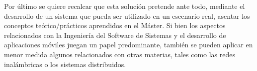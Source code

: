     Por último se quiere recalcar que esta solución pretende ante todo, mediante el desarrollo de un sistema que pueda ser utilizado en un escenario real, asentar los conceptos teórico/prácticos aprendidos en el Máster. Si bien los aspectos relacionados con la Ingeniería del Software de Sistemas y el desarrollo de aplicaciones móviles juegan un papel predominante, también se pueden aplicar en menor medida algunos relacionados con otras materias, tales como las redes inalámbricas o los sistemas distribuidos.